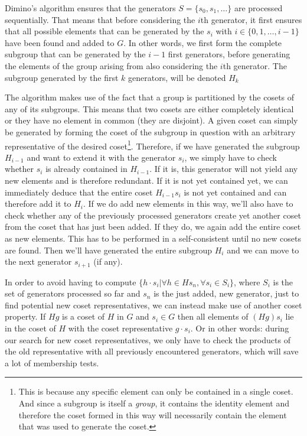 \documentclass[parskip=half]{scrartcl}
\begin{document}
	Dimino's algorithm ensures that the generators $S = \{ s_0, s_1, \ldots \}$ are processed sequentially. That means that before considering the
	$i$th generator, it first ensures that all possible elements that can be generated by the $s_i$ with $i \in \{0, 1, \ldots, i - 1 \}$ have been
	found and added to $G$.\supercite{Butler1991a} In other words, we first form the complete subgroup that can be generated by the $i-1$ first
	generators, before generating the elements of the group arising from also considering the $i$th generator. The subgroup generated by the first $k$
	generators, will be denoted $H_k$

	The algorithm makes use of the fact that a group is partitioned by the cosets of any of its subgroups.\supercite{Butler1991a} This means that two
	cosets are either completely identical or they have no element in common (they are disjoint). A given coset can simply be generated by forming the
	coset of the subgroup in question with an arbitrary representative of the desired coset\footnote{This is because any specific element can only be
		contained in a single coset. And since a subgroup is itself a \emph{group}, it contains the identity element and therefore the coset formed in
	this way will necessarily contain the element that was used to generate the coset.}. Therefore, if we have generated the subgroup $H_{i-1}$ and
	want to extend it with the generator $s_i$, we simply have to check whether $s_i$ is already contained in $H_{i-1}$. If it is, this generator will
	not yield any new elements and is therefore redundant. If it is not yet contained yet, we can immediately deduce that the entire coset $H_{i-1}
	s_i$ is not yet contained and can therefore add it to $H_i$. If we do add new elements in this way, we'll also have to check whether any of the
	previously processed generators create yet another coset from the coset that has just been added. If they do, we again add the entire coset as new
	elements. This has to be performed in a self-consistent until no new cosets are found. Then we'll have generated the entire subgroup $H_i$ and we
	can move to the next generator $s_{i+1}$ (if any).

	In order to avoid having to compute $\{ h \cdot s_i | \forall h \in H s_n, \forall s_i \in S_i \}$, where $S_i$ is the set of generators processed so
	far and $s_n$ is the just added, new generator, just to find potential new coset representatives, we can instead make use of another coset
	property. If $Hg$ is a coset of $H$ in $G$ and $s_i \in G$ then all elements of $(Hg)s_i$ lie in the coset of $H$ with the coset representative $g
	\cdot s_i$.\supercite{Butler1991a} Or in other words: during our search for new coset representatives, we only have to check the products of the
	old representative with all previously encountered generators, which will save a lot of membership tests.
\end{document}
